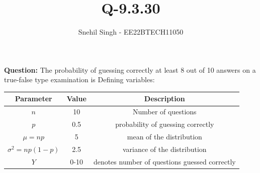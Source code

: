 \documentclass[journal,12pt,onecolumn]{IEEEtran}
\theoremstyle{remark}
\begin{document}



\vspace{3cm}

\title{
Q-9.3.30
}
\author{Snehil Singh - EE22BTECH11050}


\maketitle
\textbf{Question:} The probability of guessing correctly at least 8 out of 10 answers on a true-false type
examination is
\solution
\fi
Defining variables:
\begin{table}[H]
\def\arraystretch{1.2}
\begin{tabular}{|c|c|c|}
\hline
	\textbf{Parameter} &\textbf{Value} &\textbf{Description}\\ \hline
	$n$ &10 &Number of questions\\ 
	\hline
	$p$ &0.5 & probability of guessing correctly\\ 
	\hline
	$\mu = np$ &5 & mean of the distribution\\ 
	\hline
	$\sigma^2 = np(1-p)$ &2.5 & variance of the distribution\\ 
	\hline
	$Y$ & 0-10 & denotes number of questions guessed correctly\\
	\hline
\end{tabular}
\end{table}
\end{document}
